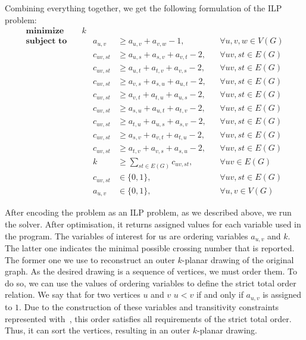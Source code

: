 Combining everything together, we get the following formulation of the ILP problem:
\begin{align}
    \textbf{minimize}\quad&k  \label{eq:ilp:objective}\\
    \textbf{subject to}\quad
    &&a_{u, v} &\geqslant a_{u, v} + a_{v, w} - 1,&&\forall u, v, w \in V(G)  \label{eq:ilp:con:transitivity}\\
    &&c_{uv, st} &\geqslant a_{u,s} + a_{s,v} + a_{v,t} - 2,&&\forall uv, st \in E(G)  \label{eq:ilp:con:cross-example}\\
    &&c_{uv, st} &\geqslant a_{u,t} + a_{t,v} + a_{v,s} - 2,&&\forall uv, st \in E(G) \label{eq:ilp:con:cross-begin}\\
    &&c_{uv, st} &\geqslant a_{v,s} + a_{s,u} + a_{u,t} - 2,&&\forall uv, st \in E(G)\\
    &&c_{uv, st} &\geqslant a_{v,t} + a_{t,u} + a_{u,s} - 2,&&\forall uv, st \in E(G)\\
    &&c_{uv, st} &\geqslant a_{s,u} + a_{u,t} + a_{t,v} - 2,&&\forall uv, st \in E(G)\\
    &&c_{uv, st} &\geqslant a_{t,u} + a_{u,s} + a_{s,v} - 2,&&\forall uv, st \in E(G)\\
    &&c_{uv, st} &\geqslant a_{s,v} + a_{v,t} + a_{t,u} - 2,&&\forall uv, st \in E(G)\\
    &&c_{uv, st} &\geqslant a_{t,v} + a_{v,s} + a_{s,u} - 2,&&\forall uv, st \in E(G)  \label{eq:ilp:con:cross-end}\\
    &&k &\geqslant \sum_{st \in E(G)} c_{uv, st},&&\forall uv \in E(G)  \label{eq:ilp:con:crossing-number}\\
    &&c_{uv, st} &\in \{0, 1\},&&\forall uv, st \in E(G)  \label{eq:ilp:con:cross-var}\\
    &&a_{u, v} &\in \{0, 1\},&&\forall u, v \in V(G)  \label{eq:ilp:con:order-var}
\end{align}

After encoding the problem as an ILP problem, as we described above, we run the solver. After optimisation, it returns assigned values for each variable used in the program. The variables of interest for us are ordering variables \(a_{u, v}\) and \(k\). The latter one indicates the minimal possible crossing number that is reported. The former one we use to reconstruct an outer \(k\)-planar drawing of the original graph. As the desired drawing is a sequence of vertices, we must order them. To do so, we can use the values of ordering variables to define the strict total order relation. We say that for two vertices \(u\) and \(v\) \(u < v\) if and only if \(a_{u, v}\) is assigned to \(1\). Due to the construction of these variables and transitivity constraints represented with~, this order satisfies all requirements of the strict total order. Thus, it can sort the vertices, resulting in an outer \(k\)-planar drawing.


